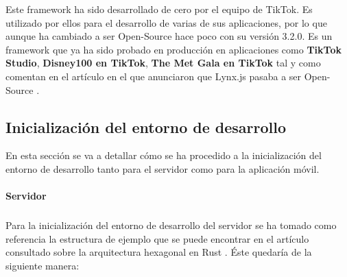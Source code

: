 Este framework ha sido desarrollado de cero por el equipo de TikTok. Es utilizado por ellos para el desarrollo de varias de sus aplicaciones, por lo que aunque ha cambiado a ser Open-Source hace poco con su versión 3.2.0. Es un framework que ya ha sido probado en producción en aplicaciones como \textbf{TikTok Studio}, \textbf{Disney100 en TikTok}, \textbf{The Met Gala en TikTok} tal y como comentan en el artículo en el que anunciaron que Lynx.js pasaba a ser Open-Source \parencite{lynx-article}.

\subsection{Inicialización del entorno de desarrollo}
En esta sección se va a detallar cómo se ha procedido a la inicialización del entorno de desarrollo tanto para el servidor como para la aplicación móvil.
\paragraph{Servidor}
\subparagraph{}
Para la inicialización del entorno de desarrollo del servidor se ha tomado como referencia la estructura de ejemplo que se puede encontrar en el artículo consultado sobre la arquitectura hexagonal en Rust \parencite{rust-hexagonal-architecture}. Éste quedaría de la siguiente manera:

